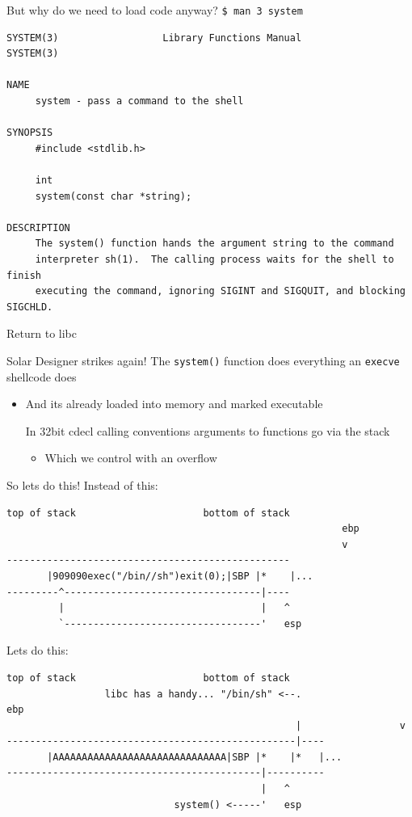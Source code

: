 \documentclass[9pt,aspectratio=169]{beamer}
\begin{document}
\begin{frame}[label={sec:orgfdf5b3d},fragile]{But why do we need to load code anyway?}
 \texttt{\$ man 3 system}

\begin{verbatim}
SYSTEM(3)                  Library Functions Manual                  SYSTEM(3)

NAME
     system - pass a command to the shell

SYNOPSIS
     #include <stdlib.h>

     int
     system(const char *string);

DESCRIPTION
     The system() function hands the argument string to the command
     interpreter sh(1).  The calling process waits for the shell to finish
     executing the command, ignoring SIGINT and SIGQUIT, and blocking SIGCHLD.
\end{verbatim}
\end{frame}
\begin{frame}[label={sec:org1086b7c},fragile]{Return to libc}
 \begin{block}{Solar Designer strikes again!}
The \texttt{system()} function does everything an \texttt{execve} shellcode does
\begin{itemize}
\item And its already loaded into memory and marked executable

In 32bit cdecl calling conventions arguments to functions go via the stack
\begin{itemize}
\item Which we control with an overflow
\end{itemize}
\end{itemize}
\end{block}
\end{frame}
\begin{frame}[label={sec:org8178b0d},fragile]{So lets do this!}
 Instead of this:
\begin{verbatim}
top of stack                      bottom of stack
                                                          ebp
                                                          v
-------------------------------------------------
       |909090exec("/bin//sh")exit(0);|SBP |*    |...
---------^----------------------------------|----
         |                                  |   ^
         `----------------------------------'   esp

\end{verbatim}

Lets do this:
\begin{verbatim}
top of stack                      bottom of stack
                 libc has a handy... "/bin/sh" <--.                 ebp
                                                  |                 v
--------------------------------------------------|----
       |AAAAAAAAAAAAAAAAAAAAAAAAAAAAAA|SBP |*    |*   |...
--------------------------------------------|----------
                                            |   ^
                             system() <-----'   esp
\end{verbatim}
\end{frame}
\end{document}
